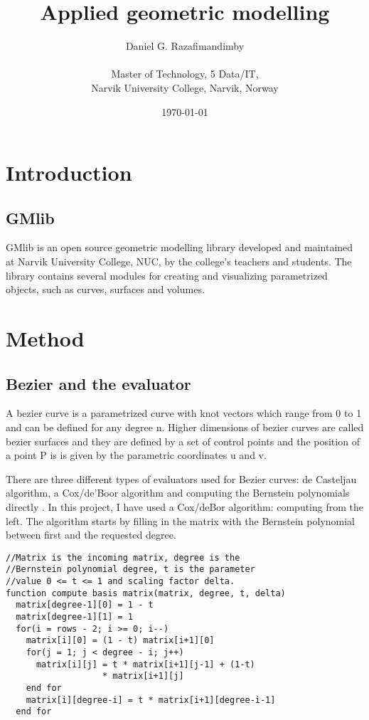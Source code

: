 \documentclass[a4paper,11pt]{article}
\title{Applied geometric modelling}
\author{
Daniel G. Razafimandimby \\ \\
Master of Technology, 5 Data/IT, \\
Narvik University College, Narvik, Norway
}
\date{\today}
\begin{document}
\maketitle
\begin{abstract}
\end{abstract}
\section{Introduction}
\subsection{GMlib}
GMlib is an open source geometric modelling library developed and maintained at Narvik University College, NUC, by the college's teachers and students. The library contains several modules for creating and visualizing parametrized objects, such as curves, surfaces and volumes.

\section{Method}
\subsection{Bezier and the evaluator}
A bezier curve is a parametrized curve with knot vectors which range from 0 to 1 and can be defined for any degree n. Higher dimensions of bezier curves are called bezier surfaces and they are defined by a set of control points and the position of a point P is is given by the parametric coordinates u and v.



There are three different types of evaluators used for Bezier curves: de Casteljau algorithm, a Cox/de'Boor algorithm and computing the Bernstein polynomials directly \cite{book_bperbs}. In this project, I have used a Cox/deBor algorithm: computing from the left. The algorithm starts by filling in the matrix with the Bernstein polynomial between first and the requested degree.

\label{fig:bezierEval1}
\begin{lstlisting}[frame=single, caption={Assigning the top half of the matrix.}] 
//Matrix is the incoming matrix, degree is the 
//Bernstein polynomial degree, t is the parameter
//value 0 <= t <= 1 and scaling factor delta.
function compute basis matrix(matrix, degree, t, delta)
  matrix[degree-1][0] = 1 - t
  matrix[degree-1][1] = 1
  for(i = rows - 2; i >= 0; i--)
    matrix[i][0] = (1 - t) matrix[i+1][0]
    for(j = 1; j < degree - i; j++)
      matrix[i][j] = t * matrix[i+1][j-1] + (1-t)
                   * matrix[i+1][j]
    end for
    matrix[i][degree-i] = t * matrix[i+1][degree-i-1]
  end for
\end{lstlisting}
\end{document}
